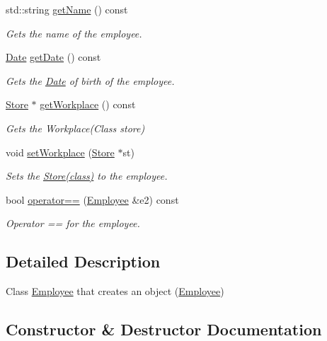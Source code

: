 \begin{DoxyCompactItemize}
std\+::string \hyperlink{class_employee_a8e7c3870f6b4b08a5c7ccccd32ca8f37}{get\+Name} () const
\begin{DoxyCompactList}\small\item\em Gets the name of the employee. \end{DoxyCompactList}\item 
\hyperlink{class_date}{Date} \hyperlink{class_employee_a1487bf0371ff0bc8c8dfab7b9f1fb321}{get\+Date} () const
\begin{DoxyCompactList}\small\item\em Gets the \hyperlink{class_date}{Date} of birth of the employee. \end{DoxyCompactList}\item 
\hyperlink{class_store}{Store} $\ast$ \hyperlink{class_employee_a3e8bde65dfb53565695b15f38cc13988}{get\+Workplace} () const
\begin{DoxyCompactList}\small\item\em Gets the Workplace(\+Class store) \end{DoxyCompactList}\item 
void \hyperlink{class_employee_a6c6abc2e287daa04a3135d44f728239c}{set\+Workplace} (\hyperlink{class_store}{Store} $\ast$st)
\begin{DoxyCompactList}\small\item\em Sets the \hyperlink{class_store}{Store(class)} to the employee. \end{DoxyCompactList}\item 
bool \hyperlink{class_employee_a522fb41eef0ffb9be36504ce2df9ddb2}{operator==} (\hyperlink{class_employee}{Employee} \&e2) const
\begin{DoxyCompactList}\small\item\em Operator == for the employee. \end{DoxyCompactList}\end{DoxyCompactItemize}


\subsection{Detailed Description}
Class \hyperlink{class_employee}{Employee} that creates an object (\hyperlink{class_employee}{Employee}) 

\subsection{Constructor \& Destructor Documentation}
\mbox{\label{class_employee_a157c273346ec4911ee412f9e21e0f4a0}} 
